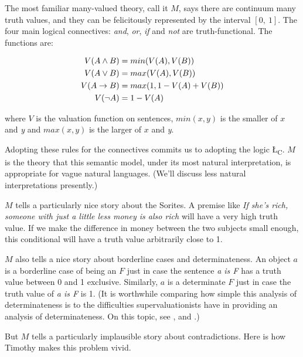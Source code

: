 The most familiar many-valued theory, call it \(M\), says there are
continuum many truth values, and they can be felicitously represented by
the interval \([0,~1]\). The four main logical connectives: \emph{and},
\emph{or}, \emph{if} and \emph{not} are truth-functional. The functions
are:

\[\begin{aligned}
V(A \wedge B) &= min(V(A), V(B))  \hspace*{\fill} \\
V(A \vee B) &= max(V(A), V(B))  \hspace*{\fill} \\
V(A \rightarrow B) &= max(1, 1 - V(A) + V(B))  \hspace*{\fill} \\
V(\neg A) &= 1 - V(A)\end{aligned}\]

where \(V\) is the valuation function on sentences, \(min(x, y)\) is the
smaller of \(x\) and \emph{y} and \(max(x, y)\) is the larger of \(x\)
and \emph{y}.

Adopting these rules for the connectives commits us to adopting the
logic {Ł}\textsubscript{C}. \(M\) is the theory that this semantic
model, under its most natural interpretation, is appropriate for vague
natural languages. (We'll discuss less natural interpretations
presently.)

\(M\) tells a particularly nice story about the Sorites. A premise like
\emph{If she's rich, someone with just a little less money is also rich}
will have a very high truth value. If we make the difference in money
between the two subjects small enough, this conditional will have a
truth value arbitrarily close to 1.

\(M\) also tells a nice story about borderline cases and
determinateness. An object \(a\) is a borderline case of being an \(F\)
just in case the sentence \emph{a is F} has a truth value between 0 and
1 exclusive. Similarly, \(a\) is a determinate \(F\) just in case the
truth value of \emph{a is F} is 1. (It is worthwhile comparing how
simple this analysis of determinateness is to the difficulties
supervaluationists have in providing an analysis of determinateness. On
this topic, see \citet{Williamson1995}, \citet{McGee1998} and
\citet{Williamson2004-WILRTM}.)

But \(M\) tells a particularly implausible story about contradictions.
Here is how Timothy \citet{Williamson1994-WILV} makes this problem
vivid.

